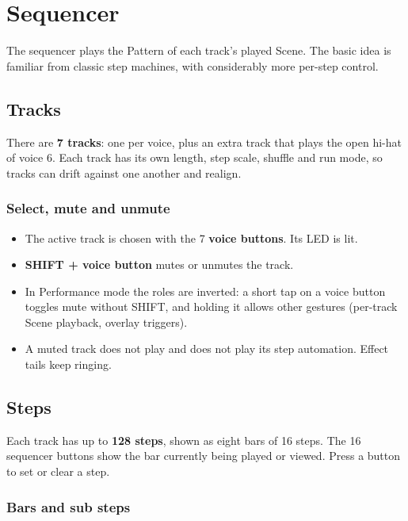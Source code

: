\section{Sequencer}\label{sequencer}

The sequencer plays the Pattern of each track's played Scene. The basic
idea is familiar from classic step machines, with considerably more
per-step control.

\subsection{Tracks}\label{tracks}

There are \textbf{7 tracks}: one per voice, plus an extra track that
plays the open hi-hat of voice 6. Each track has its own length, step
scale, shuffle and run mode, so tracks can drift against one another and
realign.

\subsubsection{Select, mute and unmute}\label{select-mute-and-unmute}

\begin{itemize}
\tightlist
\item
  The active track is chosen with the 7 \textbf{voice buttons}. Its LED
  is lit.
\item
  \textbf{SHIFT + voice button} mutes or unmutes the track.
\item
  In Performance mode the roles are inverted: a short tap on a voice
  button toggles mute without SHIFT, and holding it allows other
  gestures (per-track Scene playback, overlay triggers).
\item
  A muted track does not play and does not play its step automation.
  Effect tails keep ringing.
\end{itemize}

\subsection{Steps}\label{steps}

Each track has up to \textbf{128 steps}, shown as eight bars of 16
steps. The 16 sequencer buttons show the bar currently being played or
viewed. Press a button to set or clear a step.

\subsubsection{Bars and sub steps}\label{bars-and-sub-steps}

